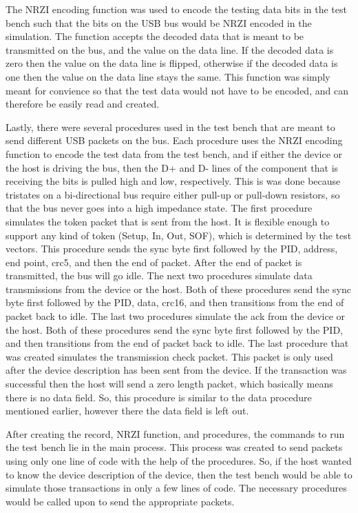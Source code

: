 \documentclass[12pt,letter,oneside]{report}
\begin{document}
The NRZI encoding function was used to encode the testing data bits in the test bench such that the bits on the USB bus would be NRZI encoded in the simulation. The function accepts the decoded data that is meant to be transmitted on the bus, and the value on the data line. If the decoded data is zero then the value on the data line is flipped, otherwise if the decoded data is one then the value on the data line stays the same. This function was simply meant for convience so that the test data would not have to be encoded, and can therefore be easily read and created.

Lastly, there were several procedures used in the test bench that are meant to send different USB packets on the bus. Each procedure uses the NRZI encoding function to encode the test data from the test bench, and if either the device or the host is driving the bus, then the D+ and D- lines of the component that is receiving the bits is pulled high and low, respectively. This is was done because tristates on a bi-directional bus require either pull-up or pull-down resistors, so that the bus never goes into a high impedance state. The first procedure simulates the token packet that is sent from the host. It is flexible enough to support any kind of token (Setup, In, Out, SOF), which is determined by the test vectors. This procedure sends the sync byte first followed by the PID, address, end point, crc5, and then the end of packet. After the end of packet is transmitted, the bus will go idle. The next two procedures simulate data transmissions from the device or the host. Both of these procedures send the sync byte first followed by the PID, data, crc16, and then transitions from the end of packet back to idle. The last two procedures simulate the ack from the device or the host. Both of these procedures send the sync byte first followed by the PID, and then transitions from the end of packet back to idle. The last procedure that was created simulates the transmission check packet. This packet is only used after the device description has been sent from the device. If the transaction was successful then the host will send a zero length packet, which basically means there is no data field. So, this procedure is similar to the data procedure mentioned earlier, however there the data field is left out.

    After creating the record, NRZI function, and procedures, the commands to run the test bench lie in the main process. This process was created to send packets using only one line of code with the help of the procedures. So, if the host wanted to know the device description of the device, then the test bench would be able to simulate those transactions in only a few lines of code. The necessary procedures would be called upon to send the appropriate packets.
\end{document}
